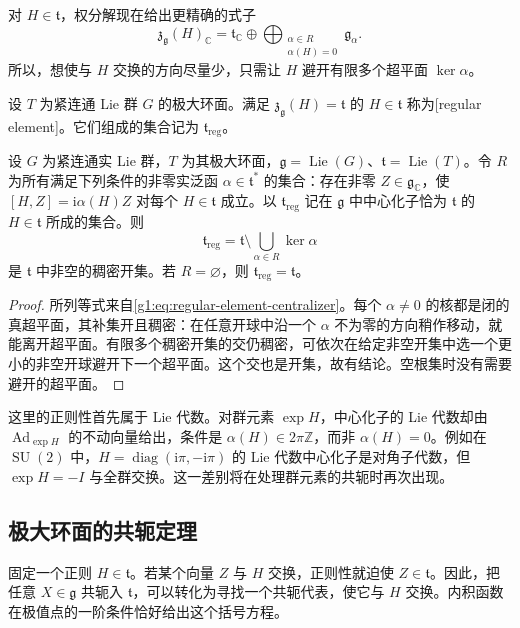 对 \(H\in\mathfrak t\)，权分解现在给出更精确的式子
\begin{equation}\label{g1:eq:regular-element-centralizer}
	\mathfrak z_{\mathfrak g}(H)_{\mathbb C}
	=\mathfrak t_{\mathbb C}\oplus
	\bigoplus_{\substack{\alpha\in R\\\alpha(H)=0}}\mathfrak g_\alpha.
\end{equation}
所以，想使与 \(H\) 交换的方向尽量少，只需让 \(H\) 避开有限多个超平面 \(\ker\alpha\)。

\begin{definition}\label{g1:def:regular-toral-element}
	设 \(T\) 为紧连通 Lie 群 \(G\) 的极大环面。满足 \(\mathfrak z_{\mathfrak g}(H)=\mathfrak t\) 的 \(H\in\mathfrak t\) 称为[regular element]。它们组成的集合记为 \(\mathfrak t_{\mathrm{reg}}\)。
\end{definition}

\begin{lemma}\label{g1:lem:regular-toral-elements}
	设 \(G\) 为紧连通实 Lie 群，\(T\) 为其极大环面，\(\mathfrak g=\operatorname{Lie}(G)\)、\(\mathfrak t=\operatorname{Lie}(T)\)。令 \(R\) 为所有满足下列条件的非零实泛函 \(\alpha\in\mathfrak t^*\) 的集合：存在非零 \(Z\in\mathfrak g_{\mathbb C}\)，使 \([H,Z]=\mathrm{i}\alpha(H)Z\) 对每个 \(H\in\mathfrak t\) 成立。以 \(\mathfrak t_{\mathrm{reg}}\) 记在 \(\mathfrak g\) 中中心化子恰为 \(\mathfrak t\) 的 \(H\in\mathfrak t\) 所成的集合。则
	\[
		\mathfrak t_{\mathrm{reg}}=
		\mathfrak t\setminus\bigcup_{\alpha\in R}\ker\alpha
	\]
	是 \(\mathfrak t\) 中非空的稠密开集。若 \(R=\varnothing\)，则 \(\mathfrak t_{\mathrm{reg}}=\mathfrak t\)。
\end{lemma}
\begin{proof}
	所列等式来自\eqref{g1:eq:regular-element-centralizer}。每个 \(\alpha\ne0\) 的核都是闭的真超平面，其补集开且稠密：在任意开球中沿一个 \(\alpha\) 不为零的方向稍作移动，就能离开超平面。有限多个稠密开集的交仍稠密，可依次在给定非空开集中选一个更小的非空开球避开下一个超平面。这个交也是开集，故有结论。空根集时没有需要避开的超平面。
\end{proof}

这里的正则性首先属于 Lie 代数。对群元素 \(\exp H\)，中心化子的 Lie 代数却由 \(\operatorname{Ad}_{\exp H}\) 的不动向量给出，条件是 \(\alpha(H)\in2\pi\mathbb Z\)，而非 \(\alpha(H)=0\)。例如在 \(\operatorname{SU}(2)\) 中，\(H=\operatorname{diag}(\mathrm{i}\pi,-\mathrm{i}\pi)\) 的 Lie 代数中心化子是对角子代数，但 \(\exp H=-I\) 与全群交换。这一差别将在处理群元素的共轭时再次出现。

\subsection{极大环面的共轭定理}
\label{g1:subsec:1903:03}
固定一个正则 \(H\in\mathfrak t\)。若某个向量 \(Z\) 与 \(H\) 交换，正则性就迫使 \(Z\in\mathfrak t\)。因此，把任意 \(X\in\mathfrak g\) 共轭入 \(\mathfrak t\)，可以转化为寻找一个共轭代表，使它与 \(H\) 交换。内积函数在极值点的一阶条件恰好给出这个括号方程。

